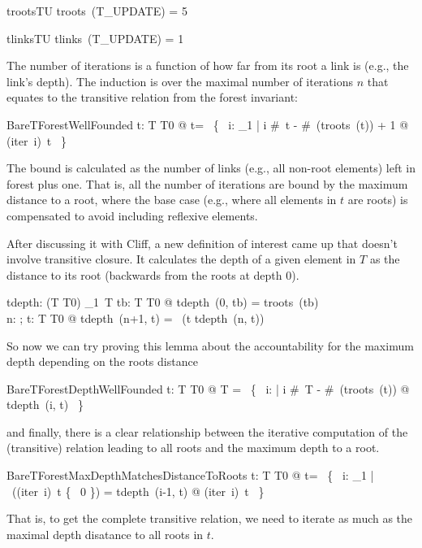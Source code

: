 \documentclass{article}
\begin{document}
\begin{theorem}{trootsTU}
	troots~(T\_UPDATE)  = 5 
\end{theorem}

\begin{theorem}{tlinksTU}
	tlinks~(T\_UPDATE)  = 1 
\end{theorem}

The number of iterations is a function of how far from its root a link is (e.g., the link's depth).
The induction is over the maximal number of iterations $n$ that equates to the transitive relation
from the forest invariant:
%
\begin{theorem}{BareTForestWellFounded}
	\forall t: T \fun T0 @ t\plus = \bigcup~\{~ i: \nat_1 | i \leq \#~t - \#~(troots~(t)) + 1 @ (iter~i)~t ~\}
\end{theorem}
%
The bound is calculated as the number of links (e.g., all non-root elements) left in forest plus one.
That is, all the number of iterations are bound by the maximum distance to a root, where the base case
(e.g., where all elements in $t$ are roots) is compensated to avoid including reflexive elements.

After discussing it with Cliff, a new definition of interest came up that doesn't involve transitive closure.
It calculates the depth of a given element in $T$ as the distance to its root (backwards from the roots at depth 0).
%
\begin{axdef}
	tdepth: \nat \cross (T \fun T0) \fun \power_1~T
\where
	\forall tb: T \fun T0 @ tdepth~(0, tb) = troots~(tb)
	\\
	\forall n: \nat; t: T \fun T0 @ tdepth~(n+1, t) = \dom~(t \rres tdepth~(n, t))
\end{axdef}
%
So now we can try proving this lemma about the accountability for the maximum depth depending on the roots distance
%
\begin{theorem}{BareTForestDepthWellFounded}
	\forall t: T \fun T0 @ T = \bigcup~\{~ i: \nat | i \leq \#~T - \#~(troots~(t)) @ tdepth~(i, t) ~\}
\end{theorem}
%
and finally, there is a clear relationship between the iterative computation of the (transitive) relation leading
to all roots and the maximum depth to a root.
%
\begin{theorem}{BareTForestMaxDepthMatchesDistanceToRoots}
	\forall t: T \fun T0 @ t\plus = \bigcup~\{~ i: \nat_1 | \dom~((iter~i)~t \rres \{~ 0 \}) = tdepth~(i-1, t) @ (iter~i)~t ~\}
\end{theorem}
%
That is, to get the complete transitive relation, we need to iterate as much as the maximal depth disatance to all roots in $t$.
\end{document}
